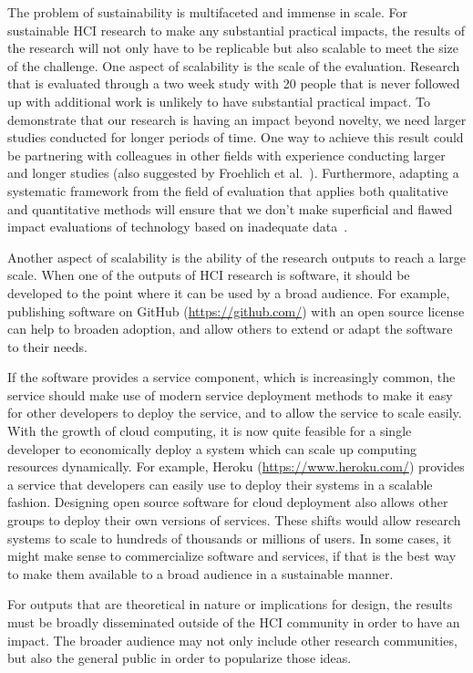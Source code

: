 \documentclass{sigchi}
\begin{document}
The problem of sustainability is multifaceted and immense in scale. For sustainable HCI research to make any substantial practical impacts, the results of the research will not only have to be replicable but also scalable to meet the size of the challenge. One aspect of scalability is the scale of the evaluation. Research that is evaluated through a two week study with 20 people that is never followed up with additional work is unlikely to have substantial practical impact. To demonstrate that our research is having an impact beyond novelty, we need larger studies conducted for longer periods of time. One way to achieve this result could be partnering with colleagues in other fields with experience conducting larger and longer studies (also suggested by Froehlich et al.~\cite{Froehlich2010}). Furthermore, adapting a systematic framework from the field of evaluation that applies both qualitative and quantitative methods will ensure that we don't make superficial and flawed impact evaluations of technology based on inadequate data~\cite{Blunck2013CEE}.

Another aspect of scalability is the ability of the research outputs to reach a large scale. When one of the outputs of HCI research is software, it should be developed to the point where it can be used by a broad audience. For example, publishing software on GitHub (\url{https://github.com/}) with an open source license can help to broaden adoption, and allow others to extend or adapt the software to their needs.

If the software provides a service component, which is increasingly common, the service should make use of modern service deployment methods to make it easy for other developers to deploy the service, and to allow the service to scale easily. With the growth of cloud computing, it is now quite feasible for a single developer to economically deploy a system which can scale up computing resources dynamically. For example, Heroku (\url{https://www.heroku.com/}) provides a service that developers can easily use to deploy their systems in a scalable fashion. Designing open source software for cloud deployment also allows other groups to deploy their own versions of services. These shifts would allow research systems to scale to hundreds of thousands or millions of users. In some cases, it might make sense to commercialize software and services, if that is the best way to make them available to a broad audience in a sustainable manner.
 
For outputs that are theoretical in nature or implications for design, the results must be broadly disseminated outside of the HCI community in order to have an impact. The broader audience may not only include other research communities, but also the general public in order to popularize those ideas.
\end{document}
